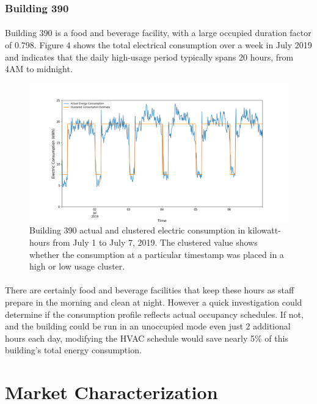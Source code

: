 \documentclass[a4paper]{article}
\begin{document}
\subsubsection{Building 390}

\paragraph{}
Building 390 is a food and beverage facility, with a large occupied duration factor of 0.798. Figure 4 shows the total electrical consumption over a week in July 2019 and indicates that the daily high-usage period typically spans 20 hours, from 4AM to midnight.

\begin{figure}[H]
\centering
\includegraphics[width=.9\columnwidth]{./images/390_Duration.png}
\caption{Building 390 actual and clustered electric consumption in kilowatt-hours from July 1 to July 7, 2019. The clustered value shows whether the consumption at a particular timestamp was placed in a high or low usage cluster.}
\end{figure}

\paragraph{}
There are certainly food and beverage facilities that keep these hours as staff prepare in the morning and clean at night. However a quick investigation could determine if the consumption profile reflects actual occupancy schedules. If not, and the building could be run in an unoccupied mode even just 2 additional hours each day, modifying the HVAC schedule would save nearly 5\% of this building's total energy consumption.

\section{Market Characterization}
\end{document}
